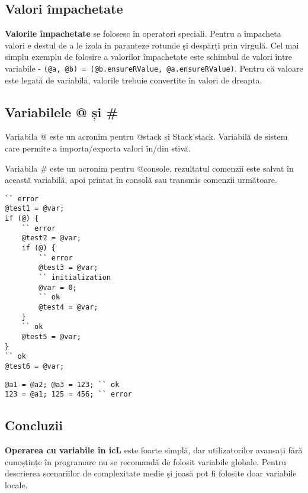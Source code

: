 \subsection{Valori împachetate}

{\bf Valorile împachetate} se folosesc în operatori speciali. Pentru a împacheta valori e destul de a le izola în paranteze rotunde și despărți prin virgulă. Cel mai simplu exemplu de folosire a valorilor împachetate este schimbul de valori între variabile - \texttt{(@a, @b) = (@b.ensureRValue, @a.ensureRValue)}. Pentru că valoare este legată de variabilă, valorile trebuie convertite în valori de dreapta.

\subsection{Variabilele @ și \#}

{Variabila @} este un acronim pentru @stack și Stack'stack. Variabilă de sistem care permite a importa/exporta valori în/din stivă. 

{Variabila \#} este un acronim pentru @console, rezultatul comenzii este salvat în această variabilă, apoi printat în consolă sau transmis comenzii următoare.


\begin{sourcecode}
\label{globalvars}
\begin{verbatim}
`` error
@test1 = @var;
if (@) {
	`` error
	@test2 = @var;
	if (@) {
		`` error
		@test3 = @var;
		`` initialization
		@var = 0;
		`` ok
		@test4 = @var;
	}
	`` ok
	@test5 = @var;
}
`` ok
@test6 = @var;
\end{verbatim}
\end{sourcecode}

\begin{sourcecode}
\label{rlvalues}
\begin{verbatim}
@a1 = @a2; @a3 = 123; `` ok
123 = @a1; 125 = 456; `` error
\end{verbatim}
\end{sourcecode}

\subsection{Concluzii}

{\bf Operarea cu variabile în icL} este foarte simplă, dar utilizatorilor avansați fără cunoștințe în programare nu se recomandă de folosit variabile globale. Pentru descrierea scenariilor de complexitate medie și joasă pot fi folosite doar variabile locale.
